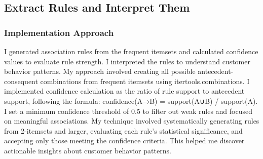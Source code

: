 \documentclass[12pt,a4paper]{article}
\begin{document}
\subsection{Extract Rules and Interpret Them}

\subsubsection{Implementation Approach}
I generated association rules from the frequent itemsets and calculated confidence values to evaluate rule strength. I interpreted the rules to understand customer behavior patterns. My approach involved creating all possible antecedent-consequent combinations from frequent itemsets using itertools.combinations. I implemented confidence calculation as the ratio of rule support to antecedent support, following the formula: confidence(A→B) = support(A∪B) / support(A). I set a minimum confidence threshold of 0.5 to filter out weak rules and focused on meaningful associations. My technique involved systematically generating rules from 2-itemsets and larger, evaluating each rule's statistical significance, and accepting only those meeting the confidence criteria. This helped me discover actionable insights about customer behavior patterns.
\end{document}
